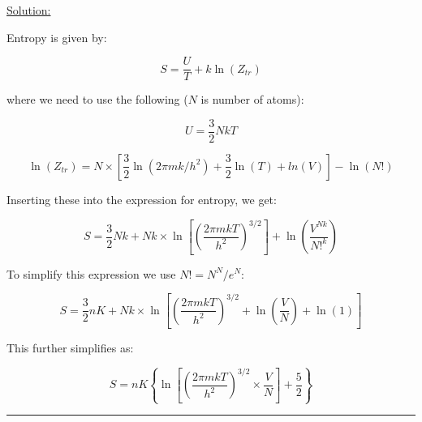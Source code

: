 \noindent
\underline{Solution:}

\noindent
Entropy is given by:

$$S = \frac{U}{T} + k\ln\left(Z_{tr}\right)$$

\noindent
where we need to use the following ($N$ is number of atoms):

$$U = \frac{3}{2}NkT$$

$$\ln\left(Z_{tr}\right) = N\times\left[\frac{3}{2}\ln\left(2\pi mk/h^2\right) + \frac{3}{2}\ln(T) + ln(V)\right] - \ln(N!)$$

\noindent
Inserting these into the expression for entropy, we get:

$$S = \frac{3}{2}Nk + Nk\times\ln\left[\left(\frac{2\pi mkT}{h^2}\right)^{3/2}\right] + \ln\left(\frac{V^{Nk}}{N!^k}\right)$$

\noindent
To simplify this expression we use $N! = N^N / e^N$:

$$S = \frac{3}{2}nK + Nk\times\ln\left[\left(\frac{2\pi mkT}{h^2}\right)^{3/2} + \ln\left(\frac{V}{N}\right) + \ln(1)\right]$$

This further simplifies as:

$$S = nK\left\lbrace\ln\left[\left(\frac{2\pi mkT}{h^2}\right)^{3/2}\times\frac{V}{N}\right] + \frac{5}{2}\right\rbrace$$

\hrule\vspace{0.5cm}
